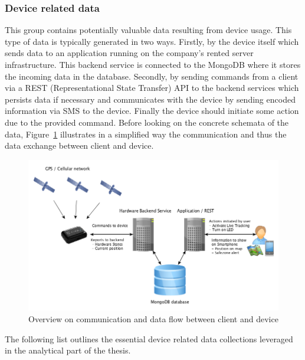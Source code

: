 \subsubsection{Device related data}
\label{sssec:deviceRelatedData}
This group contains potentially valuable data resulting from device usage. This type of data is typically generated in two ways. Firstly, by the device itself which sends data to an application running on the company's rented server infrastructure. This backend service is connected to the MongoDB where it stores the incoming data in the database. Secondly, by sending commands from a client via a REST (Representational State Transfer) API to the backend services which persists data if necessary and communicates with the device by sending encoded information via SMS to the device. Finally the device should initiate some action due to the provided command. Before looking on the concrete schemata of the data, Figure~\ref{fig:tractiveDataFlow} illustrates in a simplified way the communication and thus the data exchange between client and device. 

\begin{figure}
	\centering
		\includegraphics[width=1.0\textwidth]{img/tractiveDataFlow.png}
	\caption{Overview on communication and data flow between client and device}
	\label{fig:tractiveDataFlow}
\end{figure}

The following list outlines the essential device related data collections leveraged in the analytical part of the thesis. 

